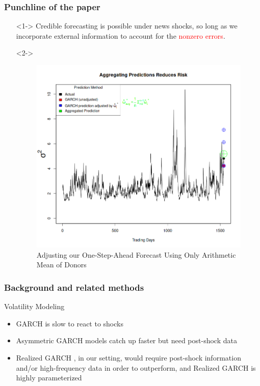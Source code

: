 \documentclass[9pt]{beamer}
\theoremstyle{definition}
\begin{document}
\begin{frame}
\frametitle{Punchline of the paper}

\begin{itemize}
    \item[] <1-> Credible forecasting is possible under news shocks, so long as we incorporate external information to account for the \textcolor{red}{nonzero errors}.
    \item[] <2-> \begin{figure}[H]
        \begin{center}
          \includegraphics[scale=.3]{simulation_plots/alternative_USE_in_paper_simulation_plot_arithmetic_mean.png}
          \caption{Adjusting our One-Step-Ahead Forecast Using Only Arithmetic Mean of Donors}
          \end{center}
        \end{figure}
\end{itemize}
\end{frame}

\begin{frame}
    \frametitle{Background and related methods}
    Volatility Modeling

    \begin{itemize}
        \item GARCH is slow to react to shocks \parencite[][]{andersen2003modeling}
        \item Asymmetric GARCH models catch up faster but need post-shock data
        \item Realized GARCH \parencite[][]{hansen2012realized}, in our setting, would require post-shock information and/or high-frequency data in order to outperform, and Realized GARCH is highly parameterized
    \end{itemize}
\end{frame}
\end{document}
